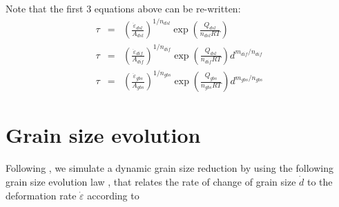 \documentclass[a4paper]{article}
\begin{document}
Note that the first 3 equations above can be re-written:
\begin{eqnarray}
\tau &=& \left(\frac{\dot{\varepsilon}_{dsl}}{A_{dsl}} \right)^{1/n_{dsl}} \exp\left(\frac{Q_{dsl}}{n_{dsl}RT} \right) \\ 
\tau &=& \left(\frac{\dot{\varepsilon}_{dif}}{A_{dif}} \right)^{1/n_{dif}} \exp\left(\frac{Q_{dsl}}{n_{dif}RT} \right) d^{m_{dif}/n_{dif}} \\
\tau &=& \left(\frac{\dot{\varepsilon}_{gbs}}{A_{gbs}} \right)^{1/n_{gbs}} \exp\left(\frac{Q_{gbs}}{n_{gbs}RT} \right) d^{m_{gbs}/n_{gbs}} 
\end{eqnarray}



\section{Grain size evolution \label{seq:gsev}}

Following \textcite{prgu09}, we simulate a dynamic grain size reduction
by using the following grain size evolution law \textcite{brcp99}, that relates
the rate of change of grain size $\dot{d}$ to the 
deformation rate $\dot{\varepsilon}$ according to
\end{document}
